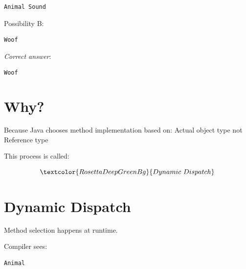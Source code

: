 \documentclass[11pt,a4paper]{book}
\begin{document}
\begin{verbatim}
Animal Sound
\end{verbatim}


Possibility B:\@

\begin{verbatim}
Woof
\end{verbatim}


\emph{\textcolor{RosettaDeepGreen}{Correct answer}}:

\begin{verbatim}
Woof
\end{verbatim}


\section{Why?}

Because Java chooses method \textcolor{RosettaRoyalPurple}{implementation}
based on: Actual \textcolor{RosettaRoyalPurple}{object} type \textcolor{RosettaRed}{not} 
\textcolor{RosettaDeepGreen}{Reference} type


This process is called:

\[
\textcolor{RosettaDeepGreenBg}{Dynamic\ Dispatch}
\]


\section{Dynamic Dispatch}

\begin{idea}

Method selection happens at runtime.

\end{idea}

\newpage
Compiler sees:

\begin{verbatim}
Animal
\end{verbatim}

\end{document}
